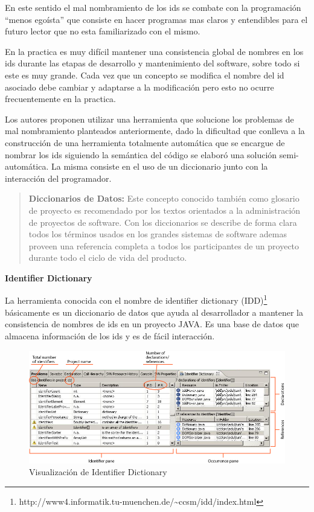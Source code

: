 \documentclass[12pt]{report}
\begin{document}
En este sentido el mal nombramiento de los ids se combate con la programación “menos egoísta” que consiste en hacer programas mas claros y entendibles para el futuro lector que no esta familiarizado con el mismo.

En la practica es muy difícil mantener una consistencia global de nombres en los ids durante las etapas de desarrollo y mantenimiento del software, sobre todo si este es muy grande. Cada vez que un concepto se modifica el nombre del id asociado debe cambiar y adaptarse a la modificación pero esto no ocurre frecuentemente en la practica.


Los autores \cite{DFPM05} proponen utilizar una herramienta que solucione los problemas de mal nombramiento planteados anteriormente, dado la dificultad que conlleva a la construcción de una herramienta totalmente automática que se encargue de nombrar los ids siguiendo la semántica del código se elaboró una solución semi-automática. La misma consiste en el uso de un diccionario junto con la interacción del programador.

\begin{verse}
\textbf{Diccionarios de Datos:} Este concepto conocido también como glosario de proyecto es recomendado por los textos orientados a la administración de proyectos de software. Con los diccionarios se describe de forma clara todos los términos usados en los grandes sistemas de software ademas proveen una referencia completa a todos los participantes de un proyecto durante todo el ciclo de vida del producto.
\end{verse}
\pagebreak 
\textbf{Identifier Dictionary\\}

La herramienta conocida con el nombre de identifier dictionary (IDD)\footnote[1]{http://www4.informatik.tu-muenchen.de/\~{}ccsm/idd/index.html} básicamente es un diccionario de datos que ayuda al desarrollador a mantener la consistencia de nombres de ids en un proyecto JAVA. Es una base de datos que almacena información de los ids y es de fácil interacción.

\begin{figure}[h] %
\centering
\includegraphics[scale= 0.50]{./idd_2.png}
\caption{Visualización de Identifier Dictionary}
\label{captura3}
\end{figure} 
\end{document}
